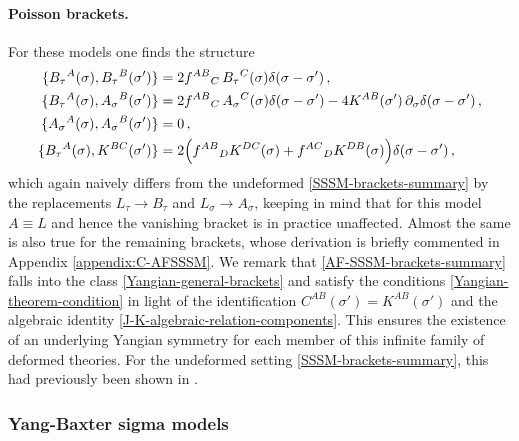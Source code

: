 \documentclass[12pt]{article}
\numberwithin{equation}{section}
\begin{document}
\paragraph{Poisson brackets.}
For these models one finds the structure
\begin{align}\label{AF-SSSM-brackets-summary}
\{ B_{\tau}{}^{A}(\sigma),B_{\tau}{}^{B}(\sigma') \} &= 2f^{AB}{}_{C} \, B_{\tau}{}^{C}(\sigma)\delta(\sigma-\sigma') \, ,
\notag \\
\{ B_{\tau}{}^{A}(\sigma),A_{\sigma}{}^{B}(\sigma') \} &= 2f^{AB}{}_{C} \, A_{\sigma}{}^{C}(\sigma)\delta(\sigma-\sigma')-4K^{AB}(\sigma') \, \partial_{\sigma}\delta(\sigma-\sigma') \, ,
\\
\{ A_{\sigma}{}^{A}(\sigma),A_{\sigma}{}^{B}(\sigma') \} &= 0 \, ,
\notag \\
\{ B_{\tau}{}^{A}(\sigma),K^{BC}(\sigma') \} &= 2\Bigl(f^{AB}{}_{D}K^{DC}(\sigma)+f^{AC}{}_{D}K^{DB}(\sigma)\Bigr)\delta(\sigma-\sigma') \, ,
\notag 
\end{align}
which again naively differs from the undeformed \eqref{SSSM-brackets-summary} by the replacements $L_{\tau}\rightarrow B_{\tau}$ and $L_{\sigma}\rightarrow A_{\sigma}$, keeping in mind that for this model $A\equiv L$ and hence the vanishing bracket is in practice unaffected. Almost the same is also true for the remaining brackets, whose derivation is briefly commented in Appendix \ref{appendix:C-AFSSSM}. We remark that \eqref{AF-SSSM-brackets-summary} falls into the class \eqref{Yangian-general-brackets} and satisfy the conditions \eqref{Yangian-theorem-condition} in light of the identification $C^{AB}(\sigma')=K^{AB}(\sigma')$ and the algebraic identity \eqref{J-K-algebraic-relation-components}. This ensures the existence of an underlying Yangian symmetry for each member of this infinite family of deformed theories. For the undeformed setting \eqref{SSSM-brackets-summary}, this had previously been shown in \cite{Klose:2016qfv}.

\subsubsection{Yang-Baxter sigma models}\label{subsubsec:YB}
\end{document}
